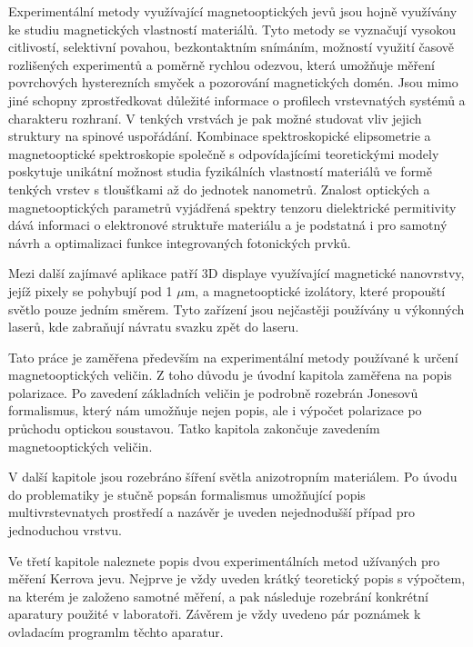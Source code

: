 Experimentální metody využívající magnetooptických jevů jsou hojně využívány ke studiu 
magnetických vlastností materiálů.  Tyto metody se vyznačují vysokou citlivostí, 
selektivní povahou, bezkontaktním snímáním, možností využití časově rozlišených experimentů 
a poměrně rychlou odezvou, která umožňuje měření povrchových hysterezních smyček a pozorování 
magnetických domén. Jsou mimo jiné schopny zprostředkovat důležité informace o profilech 
vrstevnatých systémů a charakteru rozhraní. V tenkých vrstvách je pak možné studovat vliv 
jejich struktury na spinové uspořádání. Kombinace spektroskopické elipsometrie a 
magnetooptické spektroskopie společně s odpovídajícími teoretickými modely poskytuje unikátní 
možnost studia fyzikálních vlastností materiálů ve formě tenkých vrstev s tloušťkami až do 
jednotek nanometrů. Znalost optických a magnetooptických parametrů vyjádřená spektry tenzoru 
dielektrické permitivity dává informaci o elektronové struktuře materiálu a je podstatná 
i pro samotný návrh a optimalizaci funkce integrovaných fotonických prvků.

Mezi další zajímavé aplikace patří 3D displaye využívající magnetické nanovrstvy, jejíž pixely se pohybují pod 1 $\mu$m, 
a magnetooptické izolátory, které propouští světlo pouze jedním směrem. Tyto zařízení jsou nejčastěji používány u výkonných 
laserů, kde zabraňují návratu svazku zpět do laseru.

Tato práce je zaměřena především na experimentální metody používané k určení magnetooptických veličin. Z toho důvodu 
je úvodní kapitola zaměřena na popis polarizace. Po zavedení základních veličin je podrobně rozebrán Jonesovů formalismus, 
který nám umožňuje nejen popis, ale i výpočet polarizace po průchodu optickou soustavou. Tatko kapitola zakončuje zavedením magnetooptických veličin.

V další kapitole jsou rozebráno šíření světla anizotropním materiálem. Po úvodu do problematiky je stučně popsán formalismus umožňující popis multivrstevnatych 
prostředí a nazávěr je uveden nejednodušší případ pro jednoduchou vrstvu.

Ve třetí kapitole naleznete popis dvou experimentálních metod užívaných pro měření Kerrova jevu. Nejprve je vždy uveden krátký teoretický popis s 
výpočtem, na kterém je založeno samotné měření, a pak následuje rozebrání konkrétní aparatury použité v laboratoři. Závěrem je vždy uvedeno pár 
poznámek k ovladacím programlm těchto aparatur.

